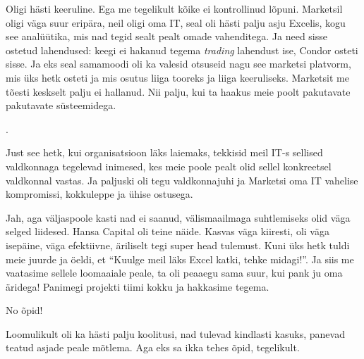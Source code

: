 
Oligi hästi keeruline. Ega me tegelikult kõike ei kontrollinud lõpuni. Marketsil oligi  väga suur eripära, neil oligi oma IT, seal oli hästi palju asju Excelis, kogu see analüütika, mis nad tegid sealt pealt omade vahenditega. Ja need sisse ostetud lahendused: keegi ei hakanud tegema \emph{trading} lahendust ise, Condor osteti sisse. Ja eks seal samamoodi oli ka valesid otsuseid nagu see marketsi platvorm, mis üks hetk osteti ja mis osutus liiga tooreks ja liiga keeruliseks. Marketsit me tõesti keskselt palju ei hallanud. Nii palju, kui ta haakus meie poolt pakutavate  pakutavate süsteemidega. 

. 

Just see hetk, kui organisatsioon läks  laiemaks, tekkisid meil IT-s sellised valdkonnaga tegelevad inimesed, kes meie poole pealt olid sellel konkreetsel valdkonnal vastas. Ja paljuski oli tegu valdkonnajuhi ja Marketsi oma IT vahelise kompromissi, kokkuleppe ja ühise ostusega. 


Jah, aga väljaspoole kasti nad ei saanud, välismaailmaga suhtlemiseks olid väga selged liidesed. Hansa Capital oli teine näide. Kasvas  väga kiiresti, oli väga isepäine, väga efektiivne, äriliselt tegi super head tulemust. Kuni üks hetk tuldi meie juurde ja öeldi, et \enquote{Kuulge meil läks Excel katki, tehke midagi!}. Ja siis me vaatasime sellele loomaaiale peale, ta oli peaaegu sama suur, kui pank ju oma äridega! Panimegi projekti tiimi kokku ja hakkasime tegema. 


No õpid! 

Loomulikult oli ka hästi palju koolitusi, nad tulevad kindlasti kasuks, panevad teatud asjade peale mõtlema. Aga eks sa ikka tehes õpid, tegelikult. 

